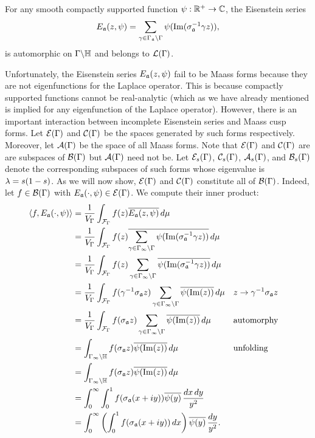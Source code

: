       \begin{theorem}
        For any smooth compactly supported function $\psi:\mathbb{R}^{+} \to \mathbb{C}$, the Eisenstein series
        \[
          E_{\mathfrak{a}}(z,\psi) = \sum_{\gamma \in \Gamma_{\mathfrak{a}}\backslash\Gamma}\psi(\mathrm{Im}(\sigma_{\mathfrak{a}}^{-1}\gamma z)),
        \]
        is automorphic on $\Gamma\backslash\mathbb{H}$ and belongs to $\mathcal{L}(\Gamma)$.
      \end{theorem}
      
      Unfortunately, the Eisenstein series $E_{\mathfrak{a}}(z,\psi)$ fail to be Maass forms because they are not eigenfunctions for the Laplace operator. This is because compactly supported functions cannot be real-analytic (which as we have already mentioned is implied for any eigenfunction of the Laplace operator). However, there is an important interaction between incomplete Eisenstein series and Maass cusp forms. Let $\mathcal{E}(\Gamma)$ and $\mathcal{C}(\Gamma)$ be the spaces generated by such forms respectively. Moreover, let $\mathcal{A}(\Gamma)$ be the space of all Maass forms. Note that $\mathcal{E}(\Gamma)$ and $\mathcal{C}(\Gamma)$ are are subspaces of $\mathcal{B}(\Gamma)$ but $\mathcal{A}(\Gamma)$ need not be. Let $\mathcal{E}_{s}(\Gamma)$, $\mathcal{C}_{s}(\Gamma)$, $\mathcal{A}_{s}(\Gamma)$, and $\mathcal{B}_{s}(\Gamma)$ denote the corresponding subspaces of such forms whose eigenvalue is $\lambda = s(1-s)$. As we will now show, $\mathcal{E}(\Gamma)$ and $\mathcal{C}(\Gamma)$ constitute all of $\mathcal{B}(\Gamma)$. Indeed, let $f \in \mathcal{B}(\Gamma)$ with $E_{\mathfrak{a}}(\cdot,\psi) \in \mathcal{E}(\Gamma)$. We compute their inner product:
      \begin{align*}
        \langle f,E_{\mathfrak{a}}(\cdot,\psi)\rangle &= \frac{1}{V_{\Gamma}}\int_{\mathcal{F}_{\Gamma}}f(z)\overline{E_{\mathfrak{a}}(z,\psi)}\,d\mu \\
        &= \frac{1}{V_{\Gamma}}\int_{\mathcal{F}_{\Gamma}}f(z)\overline{\sum_{\gamma \in \Gamma_{\infty}\backslash\Gamma}\psi(\mathrm{Im}(\sigma_{\mathfrak{a}}^{-1}\gamma z))}\,d\mu \\
        &= \frac{1}{V_{\Gamma}}\int_{\mathcal{F}_{\Gamma}}f(z)\sum_{\gamma \in \Gamma_{\infty}\backslash\Gamma}\overline{\psi(\mathrm{Im}(\sigma_{\mathfrak{a}}^{-1}\gamma z))}\,d\mu \\
        &= \frac{1}{V_{\Gamma}}\int_{\mathcal{F}_{\Gamma}}f(\gamma^{-1}\sigma_{\mathfrak{a}}z)\sum_{\gamma \in \Gamma_{\infty}\backslash\Gamma}\overline{\psi(\mathrm{Im}(z))}\,d\mu && \text{$z \to \gamma^{-1}\sigma_{\mathfrak{a}}z$} \\
        &= \frac{1}{V_{\Gamma}}\int_{\mathcal{F}_{\Gamma}}f(\sigma_{\mathfrak{a}}z)\sum_{\gamma \in \Gamma_{\infty}\backslash\Gamma}\overline{\psi(\mathrm{Im}(z))}\,d\mu  && \text{automorphy} \\
        &= \int_{\Gamma_{\infty}\backslash\mathbb{H}}f(\sigma_{\mathfrak{a}}z)\overline{\psi(\mathrm{Im}(z))}\,d\mu && \text{unfolding} \\
        &= \int_{\Gamma_{\infty}\backslash\mathbb{H}}f(\sigma_{\mathfrak{a}}z)\overline{\psi(\mathrm{Im}(z))}\,d\mu \\
        &= \int_{0}^{\infty}\int_{0}^{1}f(\sigma_{\mathfrak{a}}(x+iy))\overline{\psi(y)}\,\frac{dx\,dy}{y^{2}} \\
        &= \int_{0}^{\infty}\left(\int_{0}^{1}f(\sigma_{\mathfrak{a}}(x+iy))\,dx\right)\overline{\psi(y)}\,\frac{dy}{y^{2}}.
      \end{align*}
